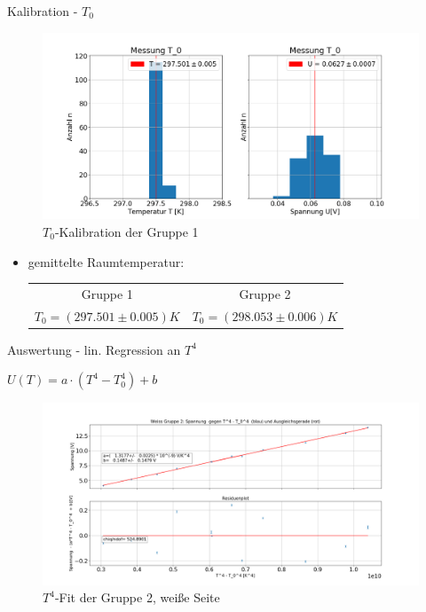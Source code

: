 \documentclass[12pt]{beamer}
\begin{document}
\begin{frame}{Kalibration - $T_0$}
\begin{figure}[H]
	\includegraphics[scale=0.2]{../Protokoll/Bilder/Gruppe1_Zimmertemperatur.png}
	\caption{$T_0$-Kalibration der Gruppe 1}
\end{figure}
\begin{itemize}
	\item gemittelte Raumtemperatur:
	\begin{table}[h]
		\centering
		\begin{tabular}{cc}
			\hline Gruppe 1 & Gruppe 2\\
			$T_0= (297.501 \pm 0.005) K$ & $T_0= (298.053 \pm 0.006)K$\\
			\hline
		\end{tabular}
	\end{table}
\end{itemize}
\end{frame}


\begin{frame}{Auswertung - lin. Regression an $T^4$}
\begin{center}
$U(T) = a \cdot (T^4-T_0^4)+b$
\vskip -0.5cm
\begin{figure}[H]
	\centering
	\includegraphics[scale=0.26]{../Protokoll/Bilder/Gruppe2_Weiss.png}
	\caption{$T^4$-Fit der Gruppe 2, weiße Seite}
\end{figure}

\end{center}
\end{frame}
\end{document}
